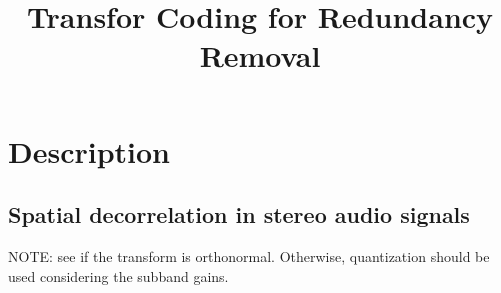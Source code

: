 \title{Transfor Coding for Redundancy Removal}

\maketitle

\section{Description}

\subsection{Spatial decorrelation in stereo audio signals}
NOTE: see if the transform is orthonormal. Otherwise, quantization should be used considering the subband gains.


